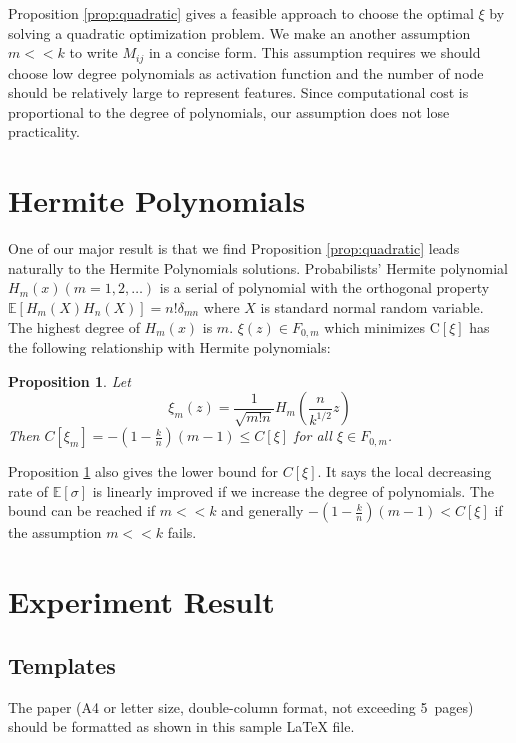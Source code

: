 \documentclass[conference,letterpaper]{IEEEtran}
\newtheorem{proposition}{Proposition}
\def\E{\mathbb{E}}
\begin{document}
Proposition \ref{prop:quadratic} gives a feasible approach to choose the optimal $\xi$ by solving a quadratic optimization problem. We make an another assumption $
m << k$ to write $M_{ij}$ in a concise form. This assumption requires we should choose low degree polynomials as activation function and the number of node should be relatively large to represent features. Since computational cost
is proportional to the degree of polynomials, our assumption does not lose practicality. 

\section{Hermite Polynomials}\label{sec:hp}

One of our major result is that we find Proposition \ref{prop:quadratic} leads naturally to the Hermite Polynomials solutions. Probabilists' Hermite polynomial $H_m(x) (m=1,2,\dots)$ is a serial of polynomial with the orthogonal property $ \E[H_m(X)H_n(X)] = n! \delta_{mn}$ where $X$ is standard normal random variable.
The highest degree of $H_m(x)$ is $m$. $\xi(z) \in F_{0, m}$ which minimizes $\mathrm{C}[\xi]$ has the following relationship with Hermite polynomials:
\begin{proposition}\label{prop:value}
Let
\begin{equation}\label{eq:ximopt}
    \xi_m(z) = \frac{1}{\sqrt{m!n}} H_m(\frac{n}{k^{1/2}} z)
\end{equation}
Then $C[\xi_m] = -(1-\frac{k}{n})(m-1) \leq C[\xi] $ for all $\xi \in F_{0, m}$.
\end{proposition}
Proposition \ref{prop:value} also gives the lower bound for $C[\xi]$.
It says the local decreasing rate of $\E[\sigma]$ is linearly improved if we increase the degree of polynomials. The bound can be reached if $ m << k$ and generally $-(1-\frac{k}{n})(m-1) < C[\xi]$ if the assumption $ m << k$ fails.

\section{Experiment Result}\label{sec:er}

\subsection{Templates}

The paper (A4 or letter size, double-column format, not exceeding
5~pages) should be formatted as shown in this sample \LaTeX{} file.
\end{document}
